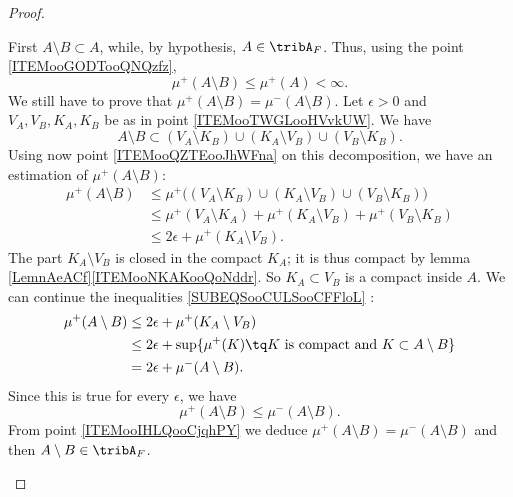 \begin{proof}
\begin{subproof}
            First \( A\setminus B\subset A\), while, by hypothesis, \( A\in \tribA_F\). Thus, using the point \ref{ITEMooGODTooQNQzfz},
            \begin{equation}
                \mu^+(A\setminus B)\leq \mu^+(A)<\infty.
            \end{equation}
            We still have to prove that \( \mu^+(A\setminus B)=\mu^-(A\setminus B)\). Let \( \epsilon>0\) and \( V_A,V_B,K_A,K_B\) be as in point \ref{ITEMooTWGLooHVvkUW}. We have
            \begin{equation}
                A\setminus B\subset (V_A\setminus K_B)\cup (K_A\setminus V_B)\cup(V_B\setminus K_B).
            \end{equation}
            Using now point \ref{ITEMooQZTEooJhWFna} on this decomposition, we have an estimation of \( \mu^+(A\setminus B)\):
            \begin{subequations}        \label{SUBEQSooCULSooCFFloL}
                \begin{align}
                    \mu^+(A\setminus B)&\leq \mu^+\Big( (V_A\setminus K_B)\cup (K_A\setminus V_B)\cup(V_B\setminus K_B) \Big)\\
                    &\leq \mu^+(V_A\setminus K_A)+\mu^+(K_A\setminus V_B)+\mu^+(V_B\setminus K_B)\\
                    &\leq 2\epsilon+\mu^+(K_A\setminus V_B).
                \end{align}
            \end{subequations}
            The part \( K_A\setminus V_B\) is closed in the compact \( K_A\); it is thus compact by lemma \ref{LemnAeACf}\ref{ITEMooNKAKooQoNddr}. So \( K_A\subset V_B\) is a compact inside \( A\). We can continue the inequalities \eqref{SUBEQSooCULSooCFFloL} :
            \begin{subequations}
                \begin{align}
                    \mu^+(A\setminus B)&\leq 2\epsilon+\mu^+(K_A\setminus V_B)\\
                    &\leq 2\epsilon+\sup\{ \mu^+(K)\tq \text{\( K\) is compact and \( K\subset A\setminus B\)} \}\\
                    &=2\epsilon+\mu^-(A\setminus B).
                \end{align}
            \end{subequations}
            Since this is true for every \( \epsilon\), we have
            \begin{equation}
                \mu^+(A\setminus B)\leq \mu^-(A\setminus B).
            \end{equation}
            From point \ref{ITEMooIHLQooCjqhPY} we deduce \( \mu^+(A\setminus B)=\mu^-(A\setminus B)\) and then \( A\setminus B\in \tribA_F\).


\end{subproof}
\end{proof}

